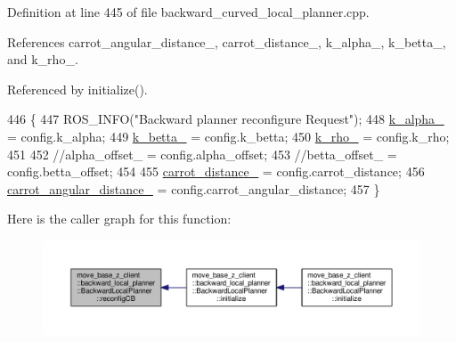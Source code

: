 Definition at line 445 of file backward\+\_\+curved\+\_\+local\+\_\+planner.\+cpp.



References carrot\+\_\+angular\+\_\+distance\+\_\+, carrot\+\_\+distance\+\_\+, k\+\_\+alpha\+\_\+, k\+\_\+betta\+\_\+, and k\+\_\+rho\+\_\+.



Referenced by initialize().


\begin{DoxyCode}
446 \{
447     ROS\_INFO(\textcolor{stringliteral}{"Backward planner reconfigure Request"});
448     \hyperlink{classmove__base__z__client_1_1backward__local__planner_1_1BackwardLocalPlanner_ac859500c0329247de08daf864fd2d4b1}{k\_alpha\_} = config.k\_alpha;
449     \hyperlink{classmove__base__z__client_1_1backward__local__planner_1_1BackwardLocalPlanner_aa2f7fe022cdc4eb11c17f6f576c732c6}{k\_betta\_} = config.k\_betta;
450     \hyperlink{classmove__base__z__client_1_1backward__local__planner_1_1BackwardLocalPlanner_a9ae9a8c4c4663a999ba107aea9f6868d}{k\_rho\_} = config.k\_rho;
451 
452     \textcolor{comment}{//alpha\_offset\_ = config.alpha\_offset;}
453     \textcolor{comment}{//betta\_offset\_ = config.betta\_offset;}
454 
455     \hyperlink{classmove__base__z__client_1_1backward__local__planner_1_1BackwardLocalPlanner_a6dc3aa0ff63f9f7d0aae852755734b5d}{carrot\_distance\_} = config.carrot\_distance;
456     \hyperlink{classmove__base__z__client_1_1backward__local__planner_1_1BackwardLocalPlanner_a3d6cba0748b85a67f5dfd7740de9530f}{carrot\_angular\_distance\_} = config.carrot\_angular\_distance;
457 \}
\end{DoxyCode}


Here is the caller graph for this function\+:\nopagebreak
\begin{figure}[H]
\begin{center}
\leavevmode
\includegraphics[width=350pt]{classmove__base__z__client_1_1backward__local__planner_1_1BackwardLocalPlanner_a9dfe3fd3fd7a0c8ec414a78e1300d09c_icgraph}
\end{center}
\end{figure}


